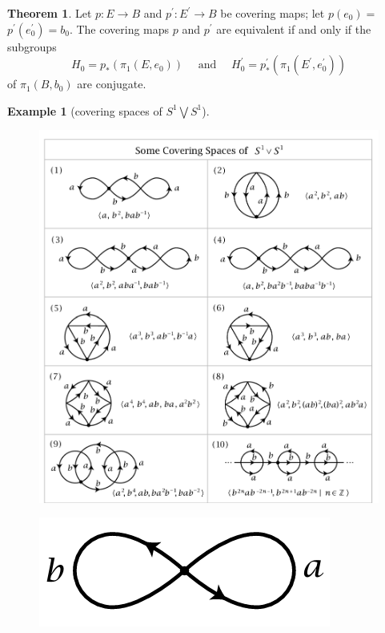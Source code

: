 \documentclass[12pt,a4paper]{book}
\theoremstyle{definition}
\newtheorem{theo}[defn]{Theorem}
\newtheorem{exam}[defn]{Example}
\begin{document}
\begin{theo}
    Let $p: E \rightarrow B$ and $p^{\prime}: E^{\prime} \rightarrow B$ be covering maps; let $p\left(e_0\right)=$ $p^{\prime}\left(e_0^{\prime}\right)=b_0$. The covering maps $p$ and $p^{\prime}$ are equivalent if and only if the subgroups
    \begin{equation*}
        H_0=p_*\left(\pi_1\left(E, e_0\right)\right) \quad \text { and } \quad H_0^{\prime}=p_*^{\prime}\left(\pi_1\left(E^{\prime}, e_0^{\prime}\right)\right)
    \end{equation*}
    of $\pi_1\left(B, b_0\right)$ are conjugate.
\end{theo}
\begin{exam}[covering spaces of $S^1\bigvee S^1$]
    \begin{figure}[H]
        \includegraphics[scale=0.7]{covering space of eight.png}
        \centering
    \end{figure}
    \begin{figure}[H]
        \includegraphics[scale=0.3]{S1S1.png}
        \centering
    \end{figure}
\end{exam}
\end{document}
